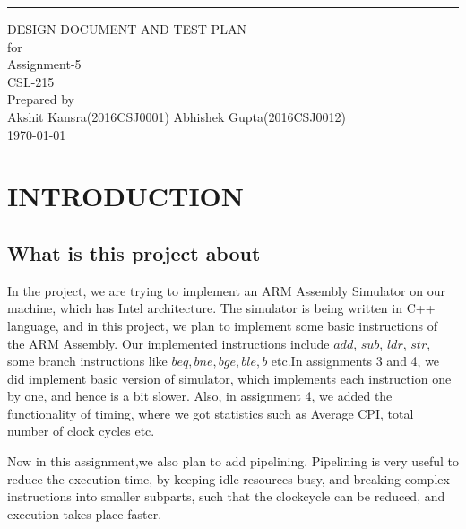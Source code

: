 \documentclass{scrreprt}
\date{}
\begin{document}
\begin{flushright}
    \rule{16cm}{5pt}\vskip1cm
    \begin{bfseries}
        \Huge{DESIGN DOCUMENT AND TEST PLAN}\\
        \vspace{1.5cm}
        for\\
        \vspace{1.5cm}
        $ $Assignment-5$ $\\
        \vspace{1cm}
        $ $CSL-215$ $\\
        \vspace{1.9cm}
        Prepared by $ $\\
		\vspace{1.5cm}        
        Akshit Kansra(2016CSJ0001) Abhishek Gupta(2016CSJ0012)$ $\\
        \vspace{1.2cm}
        \today\\
    \end{bfseries}
    
\end{flushright}

\tableofcontents

\chapter{INTRODUCTION}
\section{What is this project about}
In the project, we are trying to implement an ARM Assembly Simulator on our machine, which has Intel architecture. The simulator is being written in C++ language, and in this project, we plan to implement some basic instructions of the ARM Assembly. Our implemented instructions include $add$, $sub$, $ldr$, $str$, some branch instructions like $beq,bne, bge, ble, b$  etc.In assignments 3 and 4, we did implement basic version of simulator, which implements each instruction one by one, and hence is a bit slower. Also, in assignment 4, we added the functionality of timing, where we got statistics such as Average CPI, total number of clock cycles etc.
	
	Now in this assignment,we also plan to add pipelining. Pipelining is very useful to reduce the execution time, by keeping idle resources busy, and breaking complex instructions into smaller subparts, such that the clockcycle can be reduced, and execution takes place faster.
	
\end{document}
